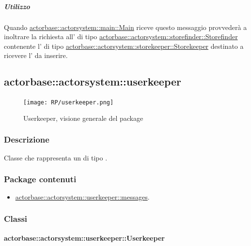 \documentclass{scalatekids-article}
\begin{document}
\subparagraph{Utilizzo}

Quando \hyperref[sec:actorbase::actorsystem::main::Main]{actorbase::\allowbreak{}actorsystem::\allowbreak{}main::\allowbreak{}Main}
riceve questo messaggio provvederà a inoltrare la richiesta all' di tipo
\hyperref[sec:actorbase::actorsystem::storefinder::Storefinder]{actorbase::\allowbreak{}actorsystem::\allowbreak{}storefinder::\allowbreak{}Storefinder}
contenente l' di tipo
\hyperref[sec:actorbase::actorsystem::storekeeper::Storekeeper]{actorbase::\allowbreak{}actorsystem::\allowbreak{}storekeeper::\allowbreak{}Storekeeper}
destinato a ricevere l' da inserire.

\subsection{actorbase::actorsystem::userkeeper}
\label{sec:actorbase::actorsystem::userkeeper}

\begin{figure}[H]
  \begin{center}
    \texttt{[image: RP/userkeeper.png]}
    \caption{Userkeeper, visione generale del package}
  \end{center}
\end{figure}

\subsubsection{Descrizione}

Classe che rappresenta un  di tipo .

\subsubsection{Package contenuti}

\begin{itemize}

\item \hyperref[sec:actorbase::actorsystem::userkeeper::messages]{actorbase::actorsystem::userkeeper::messages}.

\end{itemize}

\subsubsection{Classi}

\paragraph{actorbase::actorsystem::userkeeper::Userkeeper}
\label{sec:actorbase::actorsystem::userkeeper::Userkeeper}
\end{document}
